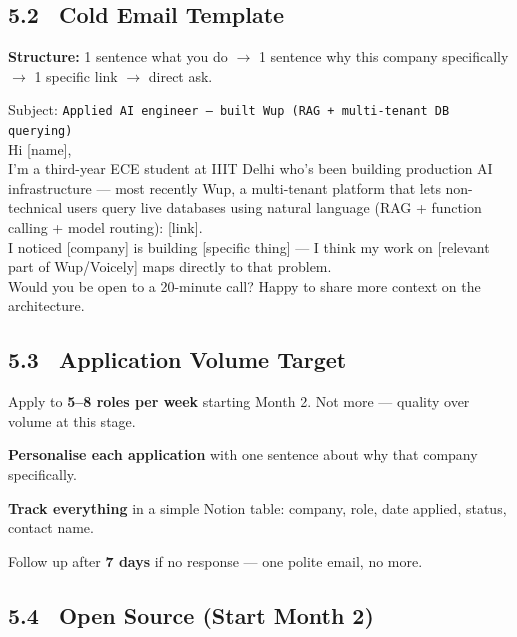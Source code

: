 \documentclass[11pt, a4paper]{article}
\begin{document}
\subsection{5.2 \ Cold Email Template}

\begin{infobox}
\textbf{Structure:} 1 sentence what you do $\rightarrow$ 1 sentence why this company specifically $\rightarrow$ 1 specific link $\rightarrow$ direct ask.

\vspace{6pt}
\small\color{muted}
Subject: \texttt{Applied AI engineer — built Wup (RAG + multi-tenant DB querying)}\\[4pt]
Hi [name],\\[4pt]
I'm a third-year ECE student at IIIT Delhi who's been building production AI infrastructure — most recently Wup, a multi-tenant platform that lets non-technical users query live databases using natural language (RAG + function calling + model routing): [link].\\[4pt]
I noticed [company] is building [specific thing] — I think my work on [relevant part of Wup/Voicely] maps directly to that problem.\\[4pt]
Would you be open to a 20-minute call? Happy to share more context on the architecture.
\end{infobox}

\subsection{5.3 \ Application Volume Target}

\begin{checklist}
  \item Apply to \textbf{5--8 roles per week} starting Month 2. Not more — quality over volume at this stage.
  \item \textbf{Personalise each application} with one sentence about why that company specifically.
  \item \textbf{Track everything} in a simple Notion table: company, role, date applied, status, contact name.
  \item Follow up after \textbf{7 days} if no response — one polite email, no more.
\end{checklist}

\subsection{5.4 \ Open Source (Start Month 2)}
\end{document}
